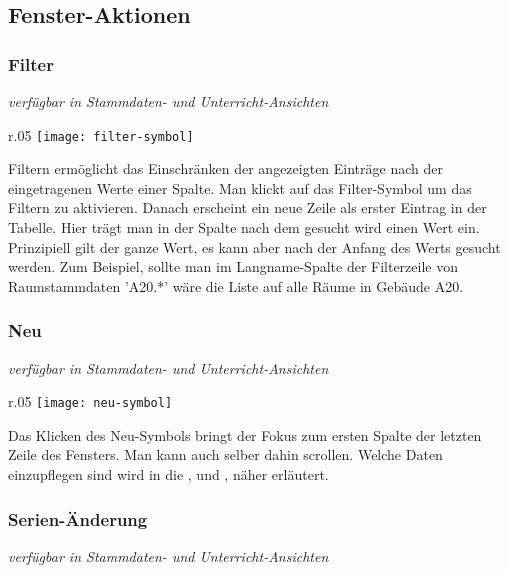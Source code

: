 \subsection{Fenster-Aktionen}

\subsubsection{Filter}%
{\small\textit{verfügbar in Stammdaten- und Unterricht-Ansichten\\}\par}

\begin{wrapfigure}{r}{.05\textwidth}
	\vspace{-50pt}
	\texttt{[image: filter-symbol]}
	\vspace{-35pt}
\end{wrapfigure}

\noindent
Filtern ermöglicht das Einschränken der angezeigten Einträge nach der eingetragenen Werte einer Spalte. Man klickt auf das Filter-Symbol um das Filtern zu aktivieren. Danach erscheint ein neue Zeile als erster Eintrag in der Tabelle. Hier trägt man in der Spalte nach dem gesucht wird einen Wert ein. Prinzipiell gilt der ganze Wert, es kann aber nach der Anfang des Werts gesucht werden. Zum Beispiel, sollte man im Langname-Spalte der Filterzeile von Raumstammdaten 'A20.*' wäre die Liste auf alle Räume in Gebäude A20.

\subsubsection{Neu}
{\small\textit{verfügbar in Stammdaten- und Unterricht-Ansichten\\}\par}

\begin{wrapfigure}{r}{.05\textwidth}
	\vspace{-50pt}
	\texttt{[image: neu-symbol]}
	\vspace{-35pt}
\end{wrapfigure}

\noindent
Das Klicken des Neu-Symbols bringt der Fokus zum ersten Spalte der letzten Zeile des Fensters. Man kann auch selber dahin scrollen. Welche Daten einzupflegen sind wird in die , und , näher erläutert.\\

\subsubsection{Serien-Änderung} 
{\small\textit{verfügbar in Stammdaten- und Unterricht-Ansichten\\}\par}

